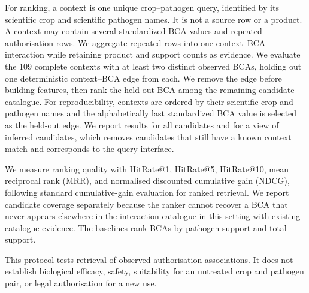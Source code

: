 For ranking, a context is one unique crop--pathogen query, identified by its scientific crop and scientific pathogen
names. It is not a source row or a product. A context may contain several standardized BCA values and repeated
authorisation rows. We aggregate repeated rows into one context--BCA interaction while retaining product and support
counts as evidence. We evaluate the 109 complete contexts with at least two distinct observed BCAs, holding out one
deterministic context--BCA edge from each. We remove the edge before
building features, then rank the held-out BCA among the remaining candidate catalogue. For reproducibility, contexts
are ordered by their scientific crop and pathogen names and the alphabetically last standardized BCA value is
selected as the held-out edge. We report results for all candidates and for a view of inferred candidates, which removes
candidates that still have a known context match and corresponds to the query interface.

We measure ranking quality with HitRate@1, HitRate@5, HitRate@10, mean reciprocal rank (MRR), and normalised
discounted cumulative gain (NDCG), following standard cumulative-gain evaluation for ranked retrieval.
We report candidate coverage separately because the ranker cannot recover a BCA
that never appears elsewhere in the interaction catalogue in this setting with existing catalogue evidence. The baselines rank BCAs
by pathogen support and total support.

This protocol tests retrieval of observed authorisation associations. It does not establish biological efficacy,
safety, suitability for an untreated crop and pathogen pair, or legal authorisation for a new use.
